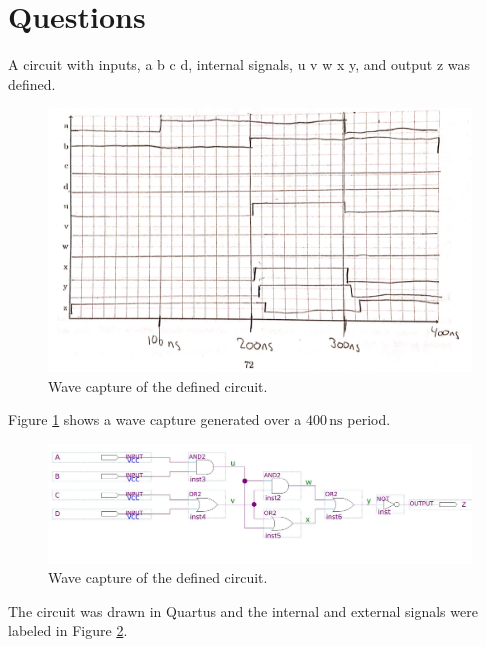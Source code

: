 \documentclass[CMPE]{KGCOEReport}
\begin{document}
\section*{Questions}

A circuit with inputs, a b c d, internal signals, u v w x y, and output z was defined.

\begin{figure}[h!]
	\centering
	\includegraphics[width=\textwidth]{question}
	\caption{Wave capture of the defined circuit.}
	\label{fig:capture-q1}
\end{figure}

Figure \ref{fig:capture-q1} shows a wave capture generated over a $400\,\si{\nano\s}$ period.
\pagebreak
\begin{figure}[h!]
	\centering
	\includegraphics[width=\textwidth]{question_schem}
	\caption{Wave capture of the defined circuit.}
	\label{fig:q1-schem}
\end{figure}

The circuit was drawn in Quartus and the internal and external signals were labeled in Figure \ref{fig:q1-schem}.
\end{document}

